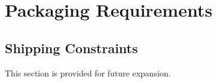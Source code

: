 \KNEADSECTIONNEWPAGE
\section{Packaging Requirements}
\label{lab:sec_Packaging}
% 


\KNEADSUBSECTIONNEWPAGE
\subsection{Shipping Constraints}
\label{lab:ssec_Packaging_ShippingConstraints_CAP}

This section is provided for future expansion.

%
